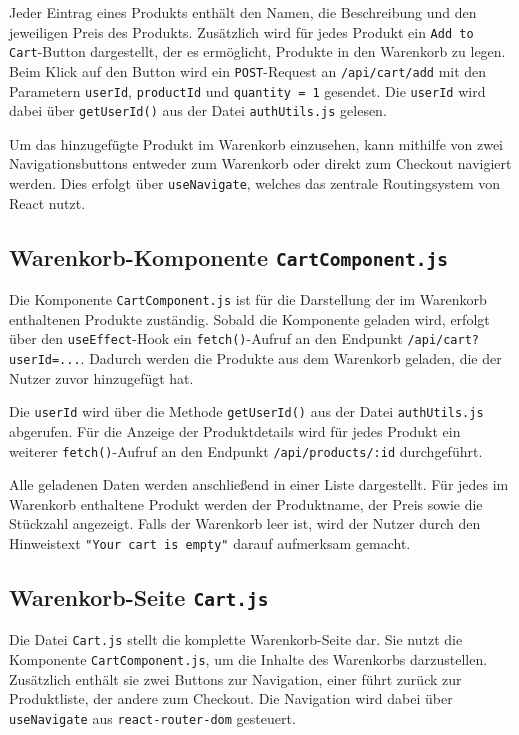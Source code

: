 \documentclass[oneside]{ausarbeitung}
\begin{document}
Jeder Eintrag eines Produkts enthält den Namen, die Beschreibung und den jeweiligen Preis des Produkts. Zusätzlich wird für jedes Produkt ein \texttt{Add to Cart}-Button dargestellt, der es ermöglicht, Produkte in den Warenkorb zu legen. Beim Klick auf den Button wird ein \texttt{POST}-Request an \texttt{/api/cart/add} mit den Parametern \texttt{userId}, \texttt{productId} und \texttt{quantity = 1} gesendet. Die \texttt{userId} wird dabei über \texttt{getUserId()} aus der Datei \texttt{authUtils.js} gelesen.

Um das hinzugefügte Produkt im Warenkorb einzusehen, kann mithilfe von zwei Navigationsbuttons entweder zum Warenkorb oder direkt zum Checkout navigiert werden. Dies erfolgt über \texttt{useNavigate}, welches das zentrale Routingsystem von React nutzt.

\subsection{Warenkorb-Komponente \texttt{CartComponent.js}} 

Die Komponente \texttt{CartComponent.js} ist für die Darstellung der im Warenkorb enthaltenen Produkte zuständig. Sobald die Komponente geladen wird, erfolgt über den \texttt{useEffect}-Hook ein \texttt{fetch()}-Aufruf an den Endpunkt \texttt{/api/cart?userId=...}. Dadurch werden die Produkte aus dem Warenkorb geladen, die der Nutzer zuvor hinzugefügt hat.

Die \texttt{userId} wird über die Methode \texttt{getUserId()} aus der Datei \texttt{authUtils.js} abgerufen. Für die Anzeige der Produktdetails wird für jedes Produkt ein weiterer \texttt{fetch()}-Aufruf an den Endpunkt \texttt{/api/products/:id} durchgeführt.

Alle geladenen Daten werden anschließend in einer Liste dargestellt. Für jedes im Warenkorb enthaltene Produkt werden der Produktname, der Preis sowie die Stückzahl angezeigt. Falls der Warenkorb leer ist, wird der Nutzer durch den Hinweistext \texttt{"Your cart is empty"} darauf aufmerksam gemacht.

\subsection{Warenkorb-Seite \texttt{Cart.js}} 

Die Datei \texttt{Cart.js} stellt die komplette Warenkorb-Seite dar.
Sie nutzt die Komponente \texttt{CartComponent.js}, um die Inhalte des Warenkorbs darzustellen. Zusätzlich enthält sie zwei Buttons zur Navigation, einer führt zurück zur Produktliste, der andere zum Checkout. Die Navigation wird dabei über \texttt{useNavigate} aus \texttt{react-router-dom} gesteuert.
\end{document}
